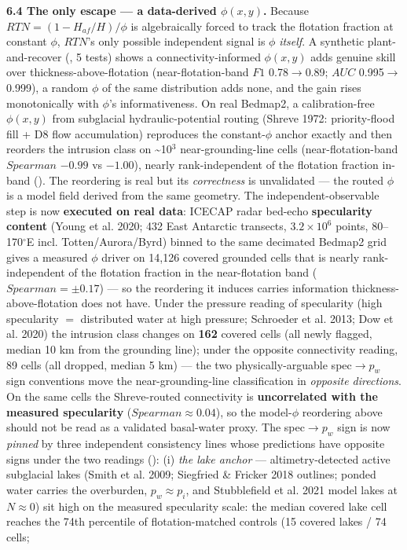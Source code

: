 \documentclass[11pt]{article}
\begin{document}
\textbf{6.4 The only escape — a data-derived $\phi (x,y)$.} Because $RTN=(1-H_{af}/H)/\phi $ is algebraically forced to track the flotation fraction at constant $\phi $, $RTN$'s only possible independent signal is $\phi $ \emph{itself}. A synthetic plant-and-recover (, 5 tests) shows a connectivity-informed $\phi (x,y)$ adds genuine skill over thickness-above-flotation (near-flotation-band $F1$ 0.78\ensuremath{\to}0.89; $AUC$ 0.995\ensuremath{\to}0.999), a random $\phi $ of the same distribution adds none, and the gain rises monotonically with $\phi $'s informativeness. On real Bedmap2, a calibration-free $\phi (x,y)$ from subglacial hydraulic-potential routing (Shreve 1972: priority-flood fill + D8 flow accumulation) reproduces the constant-$\phi $ anchor exactly and then reorders the intrusion class on \textasciitilde{}10\ensuremath{^{3}} near-grounding-line cells (near-flotation-band $Spearman$ $-0.99$ vs $-1.00$), nearly rank-independent of the flotation fraction in-band (). The reordering is real but its \emph{correctness} is unvalidated — the routed $\phi $ is a model field derived from the same geometry. The independent-observable step is now \textbf{executed on real data}: ICECAP radar bed-echo \textbf{specularity content} (Young et al. 2020; 432 East Antarctic transects, $3.2\times 10^{6}$ points, 80--170\ensuremath{^{\circ}}E incl. Totten/Aurora/Byrd) binned to the same decimated Bedmap2 grid gives a measured $\phi $ driver on 14{,}126 covered grounded cells that is nearly rank-independent of the flotation fraction in the near-flotation band ($Spearman=\pm 0.17$) — so the reordering it induces carries information thickness-above-flotation does not have. Under the pressure reading of specularity (high specularity $=$ distributed water at high pressure; Schroeder et al. 2013; Dow et al. 2020) the intrusion class changes on \textbf{162} covered cells (all newly flagged, median 10 km from the grounding line); under the opposite connectivity reading, 89 cells (all dropped, median 5 km) — the two physically-arguable spec$\to p_{w}$ sign conventions move the near-grounding-line classification in \emph{opposite directions}. On the same cells the Shreve-routed connectivity is \textbf{uncorrelated with the measured specularity} ($Spearman\approx 0.04$), so the model-$\phi $ reordering above should not be read as a validated basal-water proxy. The spec$\to p_{w}$ sign is now \emph{pinned} by three independent consistency lines whose predictions have opposite signs under the two readings (): (i) \emph{the lake anchor} — altimetry-detected active subglacial lakes (Smith et al. 2009; Siegfried \& Fricker 2018 outlines; ponded water carries the overburden, $p_{w}\approx p_{i}$, and Stubblefield et al. 2021 model lakes at $N\approx 0$) sit high on the measured specularity scale: the median covered lake cell reaches the 74th percentile of flotation-matched controls (15 covered lakes / 74 cells; 
\end{document}
